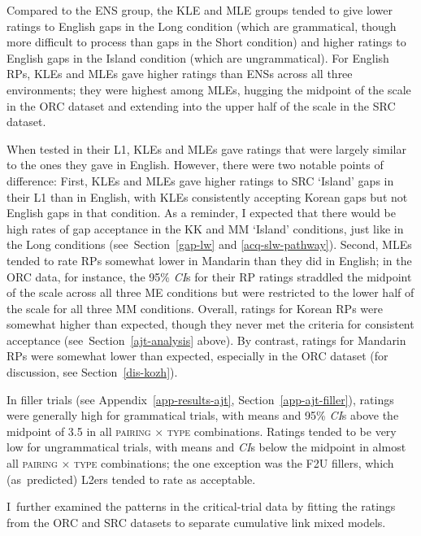 Compared to the ENS group, the KLE and MLE groups tended to give lower ratings to English gaps in the Long condition (which are grammatical, though more difficult to process than gaps in the Short condition) and higher ratings to English gaps in the Island condition (which are ungrammatical). For English RPs, KLEs and MLEs gave higher ratings than ENSs across all three environments; they were highest among MLEs, hugging the midpoint of the scale in the ORC dataset and extending into the upper half of the scale in the SRC dataset.

When tested in their L1, KLEs and MLEs gave ratings that were largely similar to the ones they gave in English. However, there were two notable points of difference: First, KLEs and MLEs gave higher ratings to SRC `Island' gaps in their L1 than in English, with KLEs consistently accepting Korean gaps but not English gaps in that condition. As a reminder, I expected that there would be high rates of gap acceptance in the KK and MM `Island' conditions, just like in the Long conditions (see~Section~\ref{gap-lw} and \ref{acq-slw-pathway}). Second, MLEs tended to rate RPs somewhat lower in Mandarin than they did in English; in the ORC data, for instance, the 95\% \textit{CI}s for their RP ratings straddled the midpoint of the scale across all three ME conditions but were restricted to the lower half of the scale for all three MM conditions. Overall, ratings for Korean RPs were somewhat higher than expected, though they never met the criteria for consistent acceptance (see~Section~\ref{ajt-analysis} above). By contrast, ratings for Mandarin RPs were somewhat lower than expected, especially in the ORC dataset (for discussion, see Section~\ref{dis-kozh}).

In filler trials (see Appendix~\ref{app-results-ajt}, Section~\ref{app-ajt-filler}), ratings were generally high for grammatical trials, with means and 95\% \textit{CI}s above the midpoint of 3.5 in all \textsc{pairing} × \textsc{type} combinations. Ratings tended to be very low for ungrammatical trials, with means and \textit{CI}s below the midpoint in almost all \textsc{pairing} × \textsc{type} combinations; the one exception was the F2U fillers, which (as~predicted) L2ers tended to rate as acceptable.

I~further examined the patterns in the critical-trial data by fitting the ratings from the ORC and SRC datasets to separate cumulative link mixed models. 

